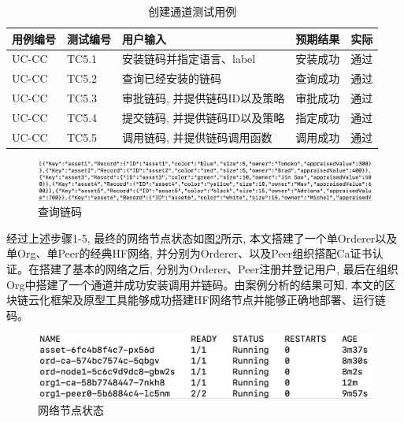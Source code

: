 {\footnotesize
\begin{longtable}[h]{m{45pt} m{45pt} m{180pt} m{50pt} m{20pt}}
    \caption[创建通道测试用例]{创建通道测试用例} \label{chaincode_test}\\
        \toprule  
        \textbf{用例编号}&\textbf{测试编号}&\textbf{用户输入}&\textbf{预期结果}&\textbf{实际}\\
        \hline
        UC-CC & TC5.1 & 安装链码并指定语言、label & 安装成功 & 通过 \\
        \hline
        UC-CC & TC5.2 & 查询已经安装的链码 & 查询成功 & 通过 \\
        \hline
        UC-CC & TC5.3 & 审批链码, 并提供链码ID以及策略 & 审批成功 & 通过 \\
        \hline
        UC-CC & TC5.4 & 提交链码, 并提供链码ID以及策略 & 指定成功 & 通过 \\
        \hline
        UC-CC & TC5.5 & 调用链码, 并提供链码调用函数 & 调用成功 & 通过 \\
        \bottomrule
    \end{longtable} 
}

\begin{figure}[h] %
    \centering %
    \includegraphics[width=1.0\textwidth]{FIGs/chapter6/chaincode.png} %
    \caption{查询链码} %
    \label{chaincode_test_result} %
\end{figure}%


经过上述步骤1-5, 最终的网络节点状态如图\ref{fabric_result}所示, 本文搭建了一个单Orderer以及单Org、单Peer的经典HF网络, 并分别为Orderer、以及Peer组织搭配Ca证书认证。在搭建了基本的网络之后, 分别为Orderer、Peer注册并登记用户, 最后在组织Org中搭建了一个通道并成功安装调用并链码。由案例分析的结果可知, 本文的区块链云化框架及原型工具能够成功搭建HF网络节点并能够正确地部署、运行链码。

\begin{figure}[h] %
    \centering %
    \includegraphics[width=1.0\textwidth]{FIGs/chapter6/fabric_result.png} %
    \caption{网络节点状态} %
    \label{fabric_result} %
\end{figure}%


